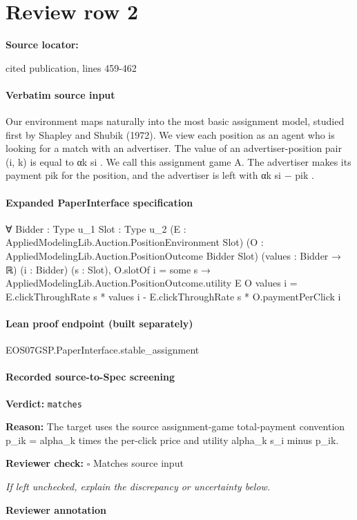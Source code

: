 \documentclass[10pt]{article}
\newcommand{\reviewerbox}{%
  \par\noindent\fbox{\parbox{0.96\linewidth}{\rule{0pt}{0.38in}}}\par
}
\newcommand{\reviewmatch}[1]{%
  \par\noindent\textbf{Reviewer check:} $\square$\; #1\par
  \noindent\emph{If left unchecked, explain the discrepancy or uncertainty below.}\par
}
\begin{document}
\section*{Review row 2}
\textbf{Source locator:} {\footnotesize\raggedright cited publication, lines 459-\allowbreak{}462\par}
\paragraph{Verbatim source input}
\begin{ReviewVerbatim}
Our environment maps naturally into the most basic assignment model, studied first by Shapley
and Shubik (1972). We view each position as an agent who is looking for a match with an advertiser.
The value of an advertiser-position pair (i, k) is equal to αk si . We call this assignment game A.
The advertiser makes its payment pik for the position, and the advertiser is left with αk si − pik .
\end{ReviewVerbatim}



\paragraph{Expanded PaperInterface specification}
\begin{ReviewVerbatim}
∀ {Bidder : Type u_1} {Slot : Type u_2} (E : AppliedModelingLib.Auction.PositionEnvironment Slot)
  (O : AppliedModelingLib.Auction.PositionOutcome Bidder Slot) (values : Bidder → ℝ) (i : Bidder) (s : Slot),
  O.slotOf i = some s →
    AppliedModelingLib.Auction.PositionOutcome.utility E O values i =
      E.clickThroughRate s * values i - E.clickThroughRate s * O.paymentPerClick i
\end{ReviewVerbatim}



\paragraph{Lean proof endpoint (built separately)}\begin{ReviewVerbatim}
EOS07GSP.PaperInterface.stable_assignment
\end{ReviewVerbatim}

\paragraph{Recorded source-to-Spec screening}
\textbf{Verdict:} \texttt{matches}
\\
{\raggedright
\textbf{Reason:} The target uses the source assignment-\allowbreak{}game total-\allowbreak{}payment convention p\_\allowbreak{}ik = alpha\_\allowbreak{}k times the per-\allowbreak{}click price and utility alpha\_\allowbreak{}k s\_\allowbreak{}i minus p\_\allowbreak{}ik.\allowbreak{}
\par}
\reviewmatch{Matches source input}
\noindent\textbf{Reviewer annotation}\par
\reviewerbox
\clearpage
\hypertarget{source-claim-5f5dbcc78d92e09e}{}
\end{document}
